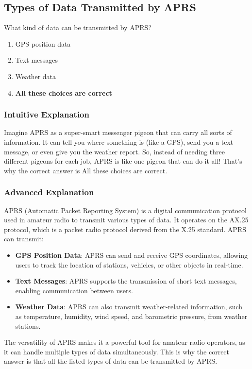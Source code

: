 \subsection{Types of Data Transmitted by APRS}
\label{T8D03}

\begin{tcolorbox}[colback=gray!10!white,colframe=black!75!black,title=T8D03]
What kind of data can be transmitted by APRS?
\begin{enumerate}[label=\Alph*)]
    \item GPS position data
    \item Text messages
    \item Weather data
    \item \textbf{All these choices are correct}
\end{enumerate}
\end{tcolorbox}

\subsubsection{Intuitive Explanation}
Imagine APRS as a super-smart messenger pigeon that can carry all sorts of information. It can tell you where something is (like a GPS), send you a text message, or even give you the weather report. So, instead of needing three different pigeons for each job, APRS is like one pigeon that can do it all! That's why the correct answer is All these choices are correct.

\subsubsection{Advanced Explanation}
APRS (Automatic Packet Reporting System) is a digital communication protocol used in amateur radio to transmit various types of data. It operates on the AX.25 protocol, which is a packet radio protocol derived from the X.25 standard. APRS can transmit:

\begin{itemize}
    \item \textbf{GPS Position Data}: APRS can send and receive GPS coordinates, allowing users to track the location of stations, vehicles, or other objects in real-time.
    \item \textbf{Text Messages}: APRS supports the transmission of short text messages, enabling communication between users.
    \item \textbf{Weather Data}: APRS can also transmit weather-related information, such as temperature, humidity, wind speed, and barometric pressure, from weather stations.
\end{itemize}

The versatility of APRS makes it a powerful tool for amateur radio operators, as it can handle multiple types of data simultaneously. This is why the correct answer is that all the listed types of data can be transmitted by APRS.

